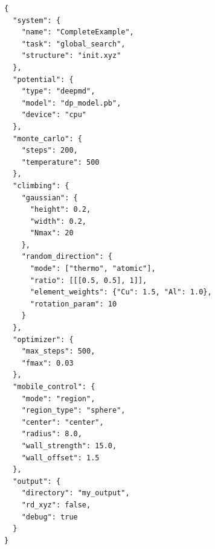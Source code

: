 \documentclass[11pt,a4paper]{article}
\begin{document}
\begin{lstlisting}[style=jsonStyle, caption={Full input.json with all options}]
{
  "system": {
    "name": "CompleteExample",
    "task": "global_search",
    "structure": "init.xyz"
  },
  "potential": {
    "type": "deepmd",
    "model": "dp_model.pb",
    "device": "cpu"
  },
  "monte_carlo": {
    "steps": 200,
    "temperature": 500
  },
  "climbing": {
    "gaussian": {
      "height": 0.2,
      "width": 0.2,
      "Nmax": 20
    },
    "random_direction": {
      "mode": ["thermo", "atomic"],
      "ratio": [[[0.5, 0.5], 1]],
      "element_weights": {"Cu": 1.5, "Al": 1.0},
      "rotation_param": 10
    }
  },
  "optimizer": {
    "max_steps": 500,
    "fmax": 0.03
  },
  "mobile_control": {
    "mode": "region",
    "region_type": "sphere",
    "center": "center",
    "radius": 8.0,
    "wall_strength": 15.0,
    "wall_offset": 1.5
  },
  "output": {
    "directory": "my_output",
    "rd_xyz": false,
    "debug": true
  }
}
\end{lstlisting}
\end{document}
